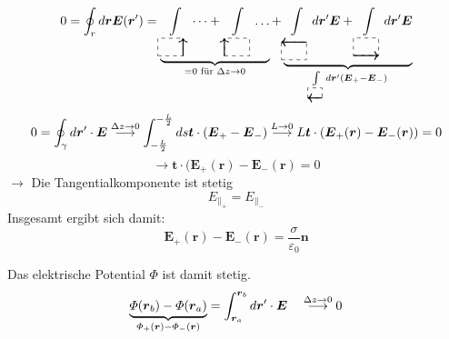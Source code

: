 \documentclass[titlepage,11pt,a4paper,ngerman]{report}
\newcommand{\tx}[1]{\textrm{#1}}
\newcommand{\ub}[1]{\underbrace{#1}}
\renewcommand{\Phi}{\varPhi}
\renewcommand{\vec}[1]{\boldsymbol{#1}}
\renewcommand{\epsilon}{\varepsilon}
\begin{document}
\begin{equation*}
0 = \oint_r d\vec{r} \vec{E}(\vec{r}') = \ub{
	\int\limits_{\begin{tikzpicture}[scale=.7]
		\draw[dashed] (0,0) -- (1,0) -- (1,.7) -- (0,.7) -- (0,0);
		\draw[thick,->] (1,0) -- (1,.7);
		\end{tikzpicture}} \dots + 
	\int\limits_{\begin{tikzpicture}[scale=.7]
		\draw[dashed] (0,0) -- (1,0) -- (1,.7) -- (0,.7) -- (0,0);
		\draw[thick,->] (0,0) -- (0,.7);
		\end{tikzpicture}} \dots}_{= 0 \tx{ für } \Delta z \to 0} + \ub{
	\int\limits_{\begin{tikzpicture}[scale=.7]
		\draw[dashed] (0,0) -- (1,0) -- (1,.7) -- (0,.7) -- (0,0);
		\draw[thick,->] (1,.7) -- (0,.7);
		\end{tikzpicture}} d\vec{r}' \vec{E} + 
	\int\limits_{\begin{tikzpicture}[scale=.7]
		\draw[dashed] (0,0) -- (1,0) -- (1,.7) -- (0,.7) -- (0,0);
		\draw[thick,->] (0,0) -- (1,0);
		\end{tikzpicture}} d\vec{r}' \vec{E} }_{
	\int\limits_{\begin{tikzpicture}[scale=.4]
		\draw[dashed] (0,0) -- (1,0) -- (1,.7) -- (0,.7) -- (0,0);
		\draw[thick,->] (1,0) -- (0,0);
		\end{tikzpicture}} d\vec{r}' (\vec{E}_+ -  \vec{E}_-)}
\end{equation*}
\begin{equation*}
0 = \oint_\gamma d\vec{r}' \cdot \vec{E} \buildrel \Delta z \to 0 \over \longrightarrow \int_{-\frac{L}{2}}^{-\frac{L}{2}} ds \vec{t} \cdot \left(\vec{E}_+ - \vec{E}_-\right) \buildrel L \to 0 \over \longrightarrow L \vec{t} \cdot \left(\vec{E}_+(\vec{r}) - \vec{E}_-(\vec{r})\right) = 0
\end{equation*}
\begin{equation*}
\rightarrow \vec{t} \cdot (\vec{E}_+ (\vec{r}) - \vec{E}_- (\vec{r}) = 0
\end{equation*}
$\rightarrow $ Die Tangentialkomponente ist stetig
\begin{equation*}
E_{\parallel_{+}} = E_{\parallel_{-}}
\end{equation*}
Insgesamt ergibt sich damit:
\begin{equation*}
\vec{E}_+(\vec{r}) - \vec{E}_-(\vec{r}) = \frac{\sigma}{\epsilon_0} \vec{n}
\end{equation*}
\begin{minipage}{.6\linewidth}
	Das elektrische Potential $ \Phi $ ist damit stetig.
	\begin{equation*}
	\ub{\Phi(\vec{r}_b) - \Phi(\vec{r}_a)}_{\Phi_+(\vec{r}) - \Phi_-(\vec{r})} = \int_{\vec{r}_a}^{\vec{r}_b} d\vec{r}' \cdot \vec{E} \quad \buildrel \Delta z \to 0 \over \longrightarrow 0
	\end{equation*}
\end{minipage}
\end{document}
